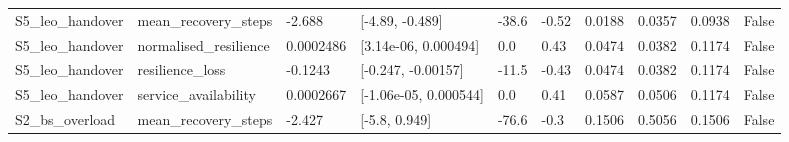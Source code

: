 \begin{tabular}{llllllllll}
S5\_leo\_handover & mean\_recovery\_steps & -2.688 & [-4.89, -0.489] & -38.6 & -0.52 & 0.0188 & 0.0357 & 0.0938 & False \\
S5\_leo\_handover & normalised\_resilience & 0.0002486 & [3.14e-06, 0.000494] & 0.0 & 0.43 & 0.0474 & 0.0382 & 0.1174 & False \\
S5\_leo\_handover & resilience\_loss & -0.1243 & [-0.247, -0.00157] & -11.5 & -0.43 & 0.0474 & 0.0382 & 0.1174 & False \\
S5\_leo\_handover & service\_availability & 0.0002667 & [-1.06e-05, 0.000544] & 0.0 & 0.41 & 0.0587 & 0.0506 & 0.1174 & False \\
S2\_bs\_overload & mean\_recovery\_steps & -2.427 & [-5.8, 0.949] & -76.6 & -0.3 & 0.1506 & 0.5056 & 0.1506 & False \\
\bottomrule
\end{tabular}
